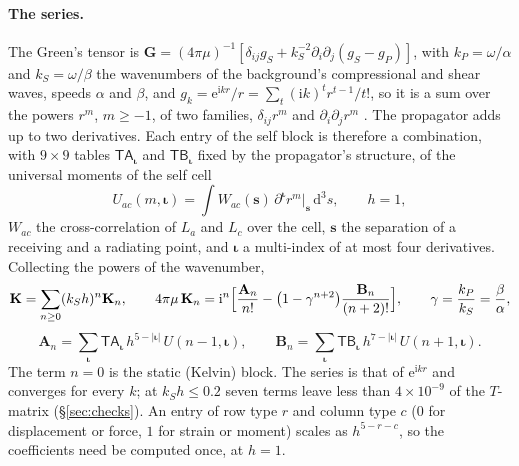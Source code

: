\documentclass[11pt,a4paper]{article}
\newcommand{\bK}{\mathbf{K}}
\newcommand{\bG}{\mathbf{G}}
\newcommand{\bs}{\mathbf{s}}
\newcommand{\biota}{\boldsymbol{\iota}}
\newcommand{\dd}{\mathrm{d}}
\begin{document}
\paragraph{The series.} The Green's tensor is $\bG=(4\pi\mu)^{-1}[\delta_{ij}g_S+k_S^{-2}\partial_i\partial_j
(g_S-g_P)]$, with $k_P=\omega/\alpha$ and $k_S=\omega/\beta$ the wavenumbers of the background's
compressional and shear waves, speeds $\alpha$ and $\beta$, and $g_k=\mathrm e^{\mathrm ikr}/r=\sum_t(\mathrm ik)^tr^{t-1}/t!$, so it is a sum over the
powers $r^m$, $m\ge-1$, of two families, $\delta_{ij}r^m$ and $\partial_i\partial_jr^m$
\citep{NestorCoupling2026}. The propagator adds up to two derivatives. Each entry of the self block is
therefore a combination, with $9\times9$ tables $\mathsf{TA}_{\biota}$ and $\mathsf{TB}_{\biota}$ fixed by the
propagator's structure, of the universal moments of the self cell
\begin{equation}\label{eq:umoment}
  U_{ac}(m,\biota)=\int W_{ac}(\bs)\,\partial^{\biota}r^m\big|_{\bs}\,\dd^3s ,\qquad h=1,
\end{equation}
$W_{ac}$ the cross-correlation of $L_a$ and $L_c$ over the cell, $\bs$ the separation of a receiving and a
radiating point, and $\biota$ a multi-index of at most four derivatives. Collecting the powers of the
wavenumber,
\begin{equation}\label{eq:kseries}
  \bK=\sum_{n\ge0}(k_Sh)^n\bK_n,\qquad
  4\pi\mu\,\bK_n=\mathrm i^n\Bigl[\frac{\mathbf A_n}{n!}-\bigl(1-\gamma^{n+2}\bigr)\frac{\mathbf B_n}{(n+2)!}\Bigr],
  \qquad \gamma=\frac{k_P}{k_S}=\frac{\beta}{\alpha},
\end{equation}
\begin{equation}\label{eq:anbn}
  \mathbf A_n=\sum_{\biota}\mathsf{TA}_{\biota}\,h^{5-|\biota|}\,U(n-1,\biota),\qquad
  \mathbf B_n=\sum_{\biota}\mathsf{TB}_{\biota}\,h^{7-|\biota|}\,U(n+1,\biota).
\end{equation}
The term $n=0$ is the static (Kelvin) block. The series is that of $\mathrm e^{\mathrm ikr}$ and converges
for every $k$; at $k_Sh\le0.2$ seven terms leave less than $4\times10^{-9}$ of the $T$-matrix
(\S\ref{sec:checks}).
An entry of row type $r$ and column type $c$ ($0$ for displacement or force, $1$ for strain or moment)
scales as $h^{5-r-c}$, so the coefficients need be computed once, at $h=1$.
\end{document}
